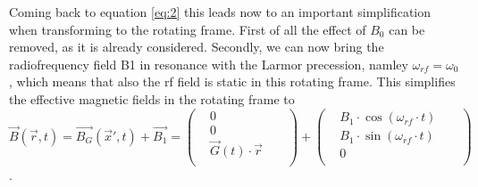 \documentclass[a4paper,12pt]{extarticle}
\begin{document}
Coming back to equation \eqref{eq:2} this leads now to an important simplification when transforming to the rotating frame. First of all the effect of $B_0$ can be removed, as it is already considered. Secondly, we can now bring the radiofrequency field B1 in resonance with the Larmor precession, namley $\omega_{rf} = \omega_0$, which means that also the rf field is static in this rotating frame. This simplifies the effective magnetic fields in the rotating frame to
 \begin{equation} 
 \vec{B}(\vec{r},t)  =  \vec{B_G}(\vec{x}',t) + \vec{B_1} = 
  \begin{pmatrix}
  & 0 \\
& 0 \\
& \vec{G}(t)\cdot\vec{r} &  & \\
\end{pmatrix}
+
 \begin{pmatrix}
  & B_1\cdot \cos(\omega_{rf}\cdot t) \\
& B_1\cdot \sin(\omega_{rf}\cdot t) \\
& 0 &  & \\
\end{pmatrix}
 \end{equation}.
 
\end{document}
